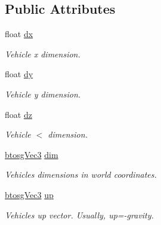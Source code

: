 \subsection*{Public Attributes}
\begin{DoxyCompactItemize}
\item 
\mbox{\label{classbtosgVehicle_aed23010bba3c34158abd4548328b3819}} 
float \hyperlink{classbtosgVehicle_aed23010bba3c34158abd4548328b3819}{dx}
\begin{DoxyCompactList}\small\item\em Vehicle x dimension. \end{DoxyCompactList}\item 
\mbox{\label{classbtosgVehicle_ae124e1cd8c424080d7be7c47edb07eb1}} 
float \hyperlink{classbtosgVehicle_ae124e1cd8c424080d7be7c47edb07eb1}{dy}
\begin{DoxyCompactList}\small\item\em Vehicle y dimension. \end{DoxyCompactList}\item 
\mbox{\label{classbtosgVehicle_a39857392dc4882886964c1beefa46268}} 
float \hyperlink{classbtosgVehicle_a39857392dc4882886964c1beefa46268}{dz}
\begin{DoxyCompactList}\small\item\em Vehicle $<$ dimension. \end{DoxyCompactList}\item 
\mbox{\label{classbtosgVehicle_a2173f99ca0719929aa5a1c890927aca3}} 
\hyperlink{classbtosgVec3}{btosg\+Vec3} \hyperlink{classbtosgVehicle_a2173f99ca0719929aa5a1c890927aca3}{dim}
\begin{DoxyCompactList}\small\item\em Vehicle\textquotesingle{}s dimensions in world coordinates. \end{DoxyCompactList}\item 
\mbox{\label{classbtosgVehicle_a84705afaa9e37bb8a0bd7f6b6f291c26}} 
\hyperlink{classbtosgVec3}{btosg\+Vec3} \hyperlink{classbtosgVehicle_a84705afaa9e37bb8a0bd7f6b6f291c26}{up}
\begin{DoxyCompactList}\small\item\em Vehicle\textquotesingle{}s up vector. Usually, up=-\/gravity. \end{DoxyCompactList}\item 

\end{DoxyCompactItemize}
